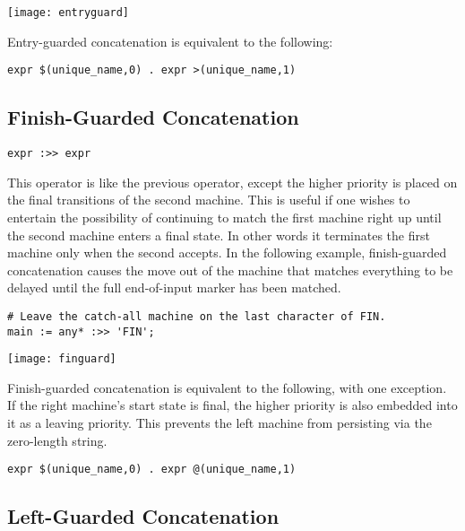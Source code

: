 \documentclass[letterpaper,11pt,oneside]{book}
\newcommand{\verbspace}{\vspace{10pt}}
\newcommand{\graphspace}{\vspace{10pt}}
\newenvironment{inline_code}{\def\baselinestretch{1}\vspace{12pt}\small}{}
\begin{document}
\graphspace
\begin{center}
\texttt{[image: entryguard]}
\end{center}
\graphspace

Entry-guarded concatenation is equivalent to the following:

\begin{verbatim}
expr $(unique_name,0) . expr >(unique_name,1)
\end{verbatim}
\verbspace

\subsection{Finish-Guarded Concatenation}

\verb|expr :>> expr|

This operator is
like the previous operator, except the higher priority is placed on the final
transitions of the second machine. This is useful if one wishes to entertain
the possibility of continuing to match the first machine right up until the
second machine enters a final state. In other words it terminates the first
machine only when the second accepts. In the following example, finish-guarded
concatenation causes the move out of the machine that matches everything to be
delayed until the full end-of-input marker has been matched.

\begin{inline_code}
\begin{verbatim}
# Leave the catch-all machine on the last character of FIN.
main := any* :>> 'FIN';
\end{verbatim}
\end{inline_code}
\verbspace
% }%%
% END GENERATE

\graphspace
\begin{center}
\texttt{[image: finguard]}
\end{center}
\graphspace

Finish-guarded concatenation is equivalent to the following, with one
exception. If the right machine's start state is final, the higher priority is
also embedded into it as a leaving priority. This prevents the left machine
from persisting via the zero-length string.

\begin{verbatim}
expr $(unique_name,0) . expr @(unique_name,1)
\end{verbatim}
\verbspace

\subsection{Left-Guarded Concatenation}
\end{document}
